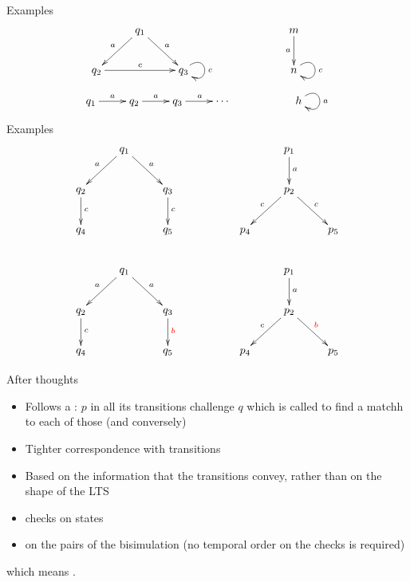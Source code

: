 \documentclass{beamer}
\begin{document}
\begin{slide}{Examples}
\small
\begin{equation*}
\xymatrix{
& q_1  \ar[ld]_{a}  \ar[rd]^{a} & & & & m \ar[d]_{a}\\
q_2 \ar[rr]^{c}  && q_3 \ar@(ur,dr)[]^{c}  & & & n\ar@(ur,dr)[]^{c}
}
\end{equation*}
\vspace{1cm}

\begin{equation*}
\xymatrix{
q_1 \ar[r]^{a} & q_2  \ar[r]^{a}  & q_3  \ar[r]^{a} & \cdots & & h\ar@(ur,dr)[]^{a}  \\
}
\end{equation*}
\end{slide}


\begin{slide}{Examples}
\small
\begin{equation*}
\xymatrix{
& q_1  \ar[ld]_{a}  \ar[rd]^{a} & & & & p_1  \ar[d]^{a} \\
q_2 \ar[d]^{c}  && q_3  \ar[d]^{c}  & && p_2  \ar[ld]_{c}  \ar[rd]^{c} & \\
q_4 & & q_5 & &p_4 & & p_5\\
& q_1  \ar[ld]_{a}  \ar[rd]^{a} & & & & p_1  \ar[d]^{a} \\
q_2 \ar[d]^{c}  && q_3  \ar[d]^{\rdb{b}}  & && p_2  \ar[ld]_{c}  \ar[rd]^{\rdb{b}} & \\
q_4 & & q_5 & &p_4 & & p_5
}
\end{equation*}
\end{slide}

\begin{slide}{After thoughts}
\small


\begin{itemize}
\item Follows a : $p$ in all its transitions challenge $q$ which is called to find a matchh to each of those (and conversely)
\item Tighter correspondence with transitions
\item Based on the information that the transitions convey, rather than on the shape of the LTS
\item {} checks on states
\item {}  on the pairs of the bisimulation (no temporal order on the checks is required)
\end{itemize}
which means .
\end{slide}
\end{document}
